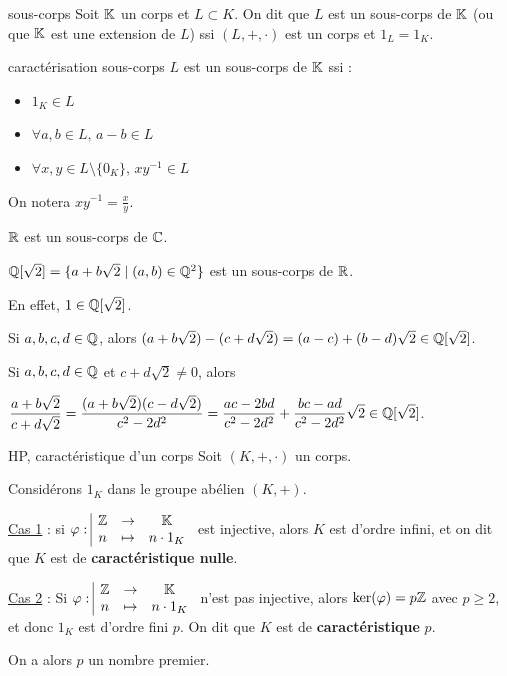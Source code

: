 \begin{definition}{sous-corps}{}
    Soit $\mathbb{K}$ un corps et $L \subset K$. On dit que $L$ est un sous-corps de $\mathbb{K}$ (ou 
    que $\mathbb{K}$ est une extension de $L$) ssi $(L, +, \cdot)$ est un corps et 
    $1_L = 1_K$.
\end{definition}



\lvspace \avspace \begin{proposition}{caractérisation sous-corps}{}
    $L$ est un sous-corps de $\mathbb{K}$ ssi :
    \begin{itemize}
        \item $1_K \in L$
        \item $\forall a, b \in L, \, a - b \in L$
        \item $\forall x, y \in L\setminus \{0_K\}, \, xy^{-1} \in L$
    \end{itemize}
\end{proposition}

\begin{remarque}
    On notera $xy^{-1} = \frac x y$. 
\end{remarque}

\begin{exemple}
    $\mathbb{R}$ est un sous-corps de $\mathbb{C}$.

    $\mathbb{Q}[\sqrt 2] = \{a + b \sqrt 2 \mid (a, b) \in \mathbb{Q}^2\}$ est un sous-corps de $\mathbb{R}$.

    En effet, $1 \in \mathbb{Q}[\sqrt 2]$.

    Si $a, b, c, d \in \mathbb{Q}$, alors $(a + b \sqrt 2) - (c + d \sqrt 2) = (a - c) + (b - d) \sqrt 2 \in \mathbb{Q}[\sqrt 2]$.

    Si $a, b, c, d \in \mathbb{Q}$ et $c + d \sqrt 2 \neq 0$, alors 
    
    $\displaystyle \frac {a + b \sqrt 2}{c + d \sqrt 2} = \frac{(a + b \sqrt 2)(c - d \sqrt 2)}{c^2 - 2d^2} = \frac{ac - 2bd}{c^2 - 2d^2} + \frac{bc - ad}{c^2 - 2d^2} \sqrt 2 \in \mathbb{Q}[\sqrt 2]$.
\end{exemple}



\begin{definition}{HP, caractéristique d'un corps}{}
    Soit $(K, +, \cdot)$ un corps.

    Considérons $1_K$ dans le groupe abélien $(K, +)$.

    \uline{Cas 1} : si $\varphi: \space \begin{array}{|ccc} \displaystyle \mathbb{Z} & \to & \displaystyle \mathbb{K} \\ \displaystyle n & \mapsto & \displaystyle n \cdot 1_K \end{array}$ est injective, alors 
    $K$ est d'ordre infini, et on dit que $K$ est de \textbf{caractéristique nulle}.

    \uline{Cas 2} : Si $\varphi: \space \begin{array}{|ccc} \displaystyle \mathbb{Z} & \to & \displaystyle \mathbb{K} \\ \displaystyle n & \mapsto & \displaystyle n \cdot 1_K \end{array}$ n'est pas injective, alors 
    $\ker(\varphi) = p \mathbb{Z}$ avec $p \geqslant 2$, et donc $1_K$ est d'ordre fini $p$. 
    On dit que $K$ est de \textbf{caractéristique} $p$. 

    On a alors $p$ un nombre premier.
\end{definition}

